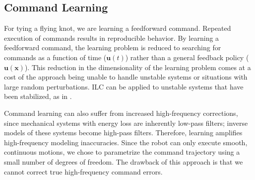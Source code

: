 \documentclass[conference]{IEEEtran}
\newcommand{\command}{\mathbf{u}}
\newcommand{\state}{\mathbf{x}}
\begin{document}

\subsection{Command Learning}
For tying a flying knot, we are learning a feedforward command. Repeated execution of commands results in reproducible behavior. By learning a feedforward command, the learning problem is reduced to searching for commands as a function of time ($\command(t)$) rather than a general feedback policy ($\command(\state)$). This reduction in the dimensionality of the learning problem comes at a cost of the approach being unable to 
handle unstable systems or situations with large random perturbations.
ILC can be applied to unstable systems that have been stabilized, as in \citet{schoellig_optimization-based_2012}. 




Command learning can also suffer from increased high-frequency corrections, since mechanical systems with energy loss are inherently low-pass filters; inverse models of these systems become high-pass filters. Therefore, learning amplifies high-frequency modeling inaccuracies. Since the robot can only execute smooth, continuous motions, we chose to parametrize the command trajectory using a small number of degrees of freedom. The drawback of this approach is that we cannot correct true high-frequency command errors. 

\end{document}
